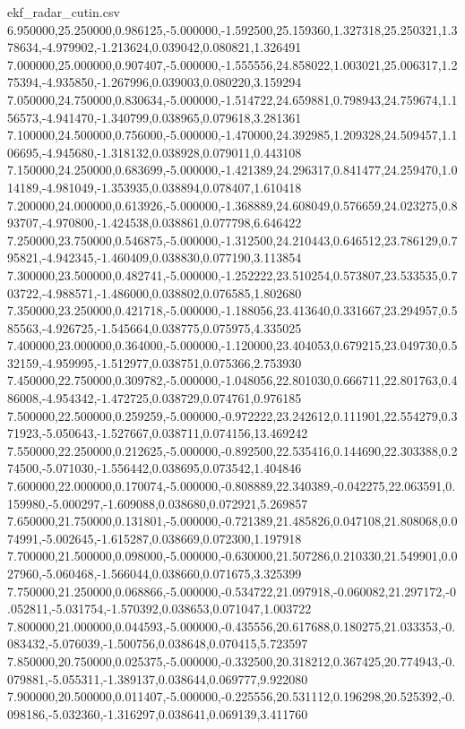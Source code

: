 \begin{filecontents*}[overwrite]{ekf_radar_cutin.csv}
6.950000,25.250000,0.986125,-5.000000,-1.592500,25.159360,1.327318,25.250321,1.378634,-4.979902,-1.213624,0.039042,0.080821,1.326491
7.000000,25.000000,0.907407,-5.000000,-1.555556,24.858022,1.003021,25.006317,1.275394,-4.935850,-1.267996,0.039003,0.080220,3.159294
7.050000,24.750000,0.830634,-5.000000,-1.514722,24.659881,0.798943,24.759674,1.156573,-4.941470,-1.340799,0.038965,0.079618,3.281361
7.100000,24.500000,0.756000,-5.000000,-1.470000,24.392985,1.209328,24.509457,1.106695,-4.945680,-1.318132,0.038928,0.079011,0.443108
7.150000,24.250000,0.683699,-5.000000,-1.421389,24.296317,0.841477,24.259470,1.014189,-4.981049,-1.353935,0.038894,0.078407,1.610418
7.200000,24.000000,0.613926,-5.000000,-1.368889,24.608049,0.576659,24.023275,0.893707,-4.970800,-1.424538,0.038861,0.077798,6.646422
7.250000,23.750000,0.546875,-5.000000,-1.312500,24.210443,0.646512,23.786129,0.795821,-4.942345,-1.460409,0.038830,0.077190,3.113854
7.300000,23.500000,0.482741,-5.000000,-1.252222,23.510254,0.573807,23.533535,0.703722,-4.988571,-1.486000,0.038802,0.076585,1.802680
7.350000,23.250000,0.421718,-5.000000,-1.188056,23.413640,0.331667,23.294957,0.585563,-4.926725,-1.545664,0.038775,0.075975,4.335025
7.400000,23.000000,0.364000,-5.000000,-1.120000,23.404053,0.679215,23.049730,0.532159,-4.959995,-1.512977,0.038751,0.075366,2.753930
7.450000,22.750000,0.309782,-5.000000,-1.048056,22.801030,0.666711,22.801763,0.486008,-4.954342,-1.472725,0.038729,0.074761,0.976185
7.500000,22.500000,0.259259,-5.000000,-0.972222,23.242612,0.111901,22.554279,0.371923,-5.050643,-1.527667,0.038711,0.074156,13.469242
7.550000,22.250000,0.212625,-5.000000,-0.892500,22.535416,0.144690,22.303388,0.274500,-5.071030,-1.556442,0.038695,0.073542,1.404846
7.600000,22.000000,0.170074,-5.000000,-0.808889,22.340389,-0.042275,22.063591,0.159980,-5.000297,-1.609088,0.038680,0.072921,5.269857
7.650000,21.750000,0.131801,-5.000000,-0.721389,21.485826,0.047108,21.808068,0.074991,-5.002645,-1.615287,0.038669,0.072300,1.197918
7.700000,21.500000,0.098000,-5.000000,-0.630000,21.507286,0.210330,21.549901,0.027960,-5.060468,-1.566044,0.038660,0.071675,3.325399
7.750000,21.250000,0.068866,-5.000000,-0.534722,21.097918,-0.060082,21.297172,-0.052811,-5.031754,-1.570392,0.038653,0.071047,1.003722
7.800000,21.000000,0.044593,-5.000000,-0.435556,20.617688,0.180275,21.033353,-0.083432,-5.076039,-1.500756,0.038648,0.070415,5.723597
7.850000,20.750000,0.025375,-5.000000,-0.332500,20.318212,0.367425,20.774943,-0.079881,-5.055311,-1.389137,0.038644,0.069777,9.922080
7.900000,20.500000,0.011407,-5.000000,-0.225556,20.531112,0.196298,20.525392,-0.098186,-5.032360,-1.316297,0.038641,0.069139,3.411760

\end{filecontents*}
